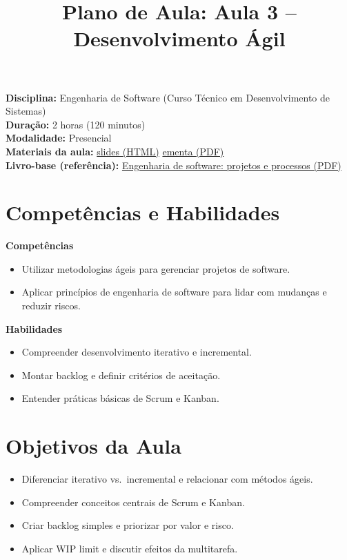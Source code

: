 \documentclass[12pt,a4paper]{article}
\title{Plano de Aula: Aula 3 -- Desenvolvimento Ágil}
\date{}
\begin{document}
\maketitle

\noindent
\textbf{Disciplina:} Engenharia de Software (Curso Técnico em Desenvolvimento de Sistemas)\\
\textbf{Duração:} 2 horas (120 minutos)\\
\textbf{Modalidade:} Presencial\\
\textbf{Materiais da aula:} \href{aula-03.html}{slides (HTML)} \quad \href{aula-03.pdf}{ementa (PDF)}\\
\textbf{Livro-base (referência):} \href{../99-Materiais/Engenharia%20de%20software%20projetos%20e%20processos%20by%20Wilson%20de%20P%C3%A1dua%20Paula%20Filho%20.epub.pdf}{Engenharia de software: projetos e processos (PDF)}

\section{Competências e Habilidades}
\textbf{Competências}
\begin{itemize}[leftmargin=*,itemsep=0.25em]
  \item Utilizar metodologias ágeis para gerenciar projetos de software.
  \item Aplicar princípios de engenharia de software para lidar com mudanças e reduzir riscos.
\end{itemize}

\textbf{Habilidades}
\begin{itemize}[leftmargin=*,itemsep=0.25em]
  \item Compreender desenvolvimento iterativo e incremental.
  \item Montar backlog e definir critérios de aceitação.
  \item Entender práticas básicas de Scrum e Kanban.
\end{itemize}

\section{Objetivos da Aula}
\begin{itemize}[leftmargin=*,itemsep=0.25em]
  \item Diferenciar iterativo vs.\ incremental e relacionar com métodos ágeis.
  \item Compreender conceitos centrais de Scrum e Kanban.
  \item Criar backlog simples e priorizar por valor e risco.
  \item Aplicar WIP limit e discutir efeitos da multitarefa.
\end{itemize}
\end{document}
